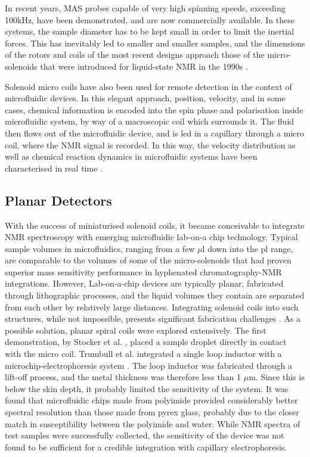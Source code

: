 In recent years, MAS probes
capable of very high spinning speeds, exceeding 100kHz, have been
demonstrated, and are now commercially available. In these systems, the
sample diameter has to be kept small in order to limit the inertial
forces. This has inevitably led to smaller and smaller samples, and the
dimensions of the rotors and coils of the most recent designs approach
those of the micro-solenoids that were introduced for liquid-state NMR
in the 1990s \cite{Samoson:2010et}. 

Solenoid micro coils have also been
used for remote detection in the context of microfluidic devices. In
this elegant approach, position, velocity, and in some cases, chemical
information is encoded into the spin phase and polarisation inside
microfluidic system, by way of a macroscopic coil which surrounds it.
The fluid then flows out of the microfluidic device, and is led in a
capillary through a micro coil, where the NMR signal is recorded. In
this way, the velocity distribution as well as chemical reaction
dynamics in microfluidic systems have been characterised in real time
\cite{Hilty:2005eq, McDonnell:2005dn,Harel:2007bs, Bouchard:2008hv,
Ledbetter:2008kp,Harel:2009eg,Bajaj:2010cy,Telkki:2011wi,Telkki:2014jf}.

\subsection{Planar Detectors}\label{nmr-and-microfluidics-planar-detectors}
With the success of miniaturised solenoid coils, it became conceivable
to integrate NMR spectroscopy with emerging microfluidic lab-on-a chip
technology. Typical sample volumes in microfluidics, ranging from a few
$\mu$l down into the pl range, are comparable to the volumes of some of
the micro-solenoids that had proven superior mass sensitivity
performance in hyphenated chromatography-NMR integrations. However,
Lab-on-a-chip devices are typically planar, fabricated through
lithographic processes, and the liquid volumes they contain are
separated from each other by relatively large distances. Integrating
solenoid coils into such structures, while not impossible, presents
significant fabrication challenges \cite{Badilita:2010hb}. As a possible
solution, planar spiral coils were explored extensively. The first
demonstration, by Stocker et al. \cite{Stocker:1997by}, placed a sample
droplet directly in contact with the micro coil. Trumbull et al.
integrated a single loop inductor with a microchip-electrophoresis
system \cite{Trumbull:2000fa}. The loop inductor
was fabricated through a lift-off process, and the metal thickness 
was therefore less than 1 $\mu$m. Since this is below the skin depth, it
probably limited the sensitivity of the system. It was found that
microfluidic chips made from polyimide provided
considerably better spectral resolution than those made from pyrex glass,
 probably due to the closer
 match in susceptibility between the polyimide and water. While NMR
spectra of test samples were successfully collected, the sensitivity of
the device was not found to be sufficient for a credible integration
with capillary electrophoresis. 

